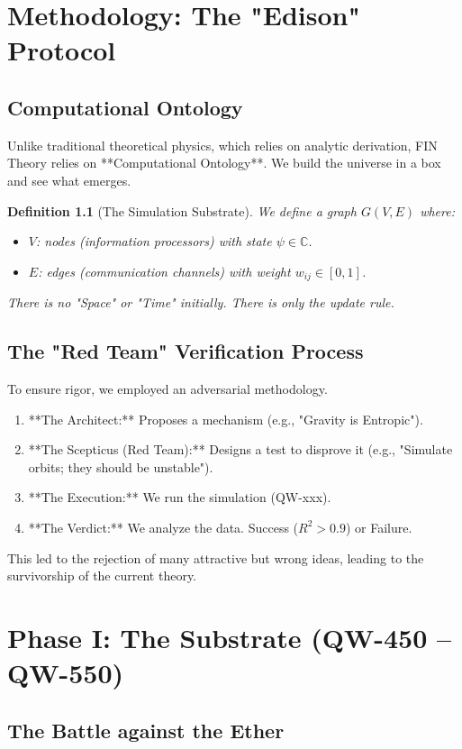 \documentclass[11pt, a4paper]{report}
\newtheorem{definition}{Definition}[chapter]
\begin{document}
\chapter{Methodology: The "Edison" Protocol}
\label{chap:method}

\section{Computational Ontology}
Unlike traditional theoretical physics, which relies on analytic derivation, FIN Theory relies on **Computational Ontology**. We build the universe in a box and see what emerges.
\begin{definition}[The Simulation Substrate]
We define a graph $G(V, E)$ where:
\begin{itemize}
    \item $V$: nodes (information processors) with state $\psi \in \mathbb{C}$.
    \item $E$: edges (communication channels) with weight $w_{ij} \in [0,1]$.
\end{itemize}
There is no "Space" or "Time" initially. There is only the update rule.
\end{definition}

\section{The "Red Team" Verification Process}
To ensure rigor, we employed an adversarial methodology.
\begin{enumerate}
    \item **The Architect:** Proposes a mechanism (e.g., "Gravity is Entropic").
    \item **The Scepticus (Red Team):** Designs a test to disprove it (e.g., "Simulate orbits; they should be unstable").
    \item **The Execution:** We run the simulation (QW-xxx).
    \item **The Verdict:** We analyze the data. Success ($R^2 > 0.9$) or Failure.
\end{enumerate}
This led to the rejection of many attractive but wrong ideas, leading to the survivorship of the current theory.

\chapter{Phase I: The Substrate (QW-450 -- QW-550)}
\label{chap:phase1}

\section{The Battle against the Ether}
\end{document}
